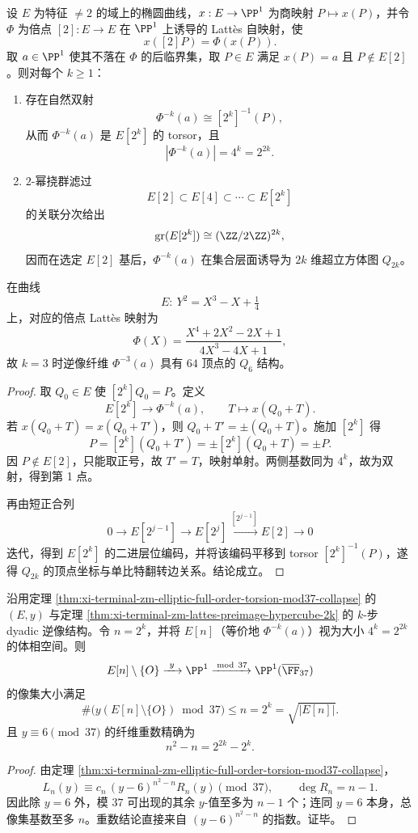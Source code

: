 \begin{theorem}\label{thm:xi-terminal-zm-lattes-preimage-hypercube-2k}
设 \(E\) 为特征 \(\neq 2\) 的域上的椭圆曲线，\(x:E\to\PP^{1}\) 为商映射 \(P\mapsto x(P)\)，并令 \(\Phi\) 为倍点 \([2]:E\to E\) 在 \(\PP^{1}\) 上诱导的 Latt\`es 自映射，使
\[
x([2]P)=\Phi(x(P)).
\]
取 \(a\in\PP^{1}\) 使其不落在 \(\Phi\) 的后临界集，取 \(P\in E\) 满足 \(x(P)=a\) 且 \(P\notin E[2]\)。则对每个 \(k\ge 1\)：
\begin{enumerate}
  \item 存在自然双射
  \[
  \Phi^{-k}(a)\cong [2^{k}]^{-1}(P),
  \]
  从而 \(\Phi^{-k}(a)\) 是 \(E[2^k]\) 的 torsor，且
  \[
  |\Phi^{-k}(a)|=4^k=2^{2k}.
  \]
  \item \(2\)-幂挠群滤过
  \[
  E[2]\subset E[4]\subset\cdots\subset E[2^k]
  \]
  的关联分次给出
  \[
  \mathrm{gr}(E[2^k])\cong(\ZZ/2\ZZ)^{2k},
  \]
  因而在选定 \(E[2]\) 基后，\(\Phi^{-k}(a)\) 在集合层面诱导为 \(2k\) 维超立方体图 \(Q_{2k}\)。
\end{enumerate}
在曲线
\[
E:\ Y^{2}=X^{3}-X+\tfrac14
\]
上，对应的倍点 Latt\`es 映射为
\[
\Phi(X)=\frac{X^{4}+2X^{2}-2X+1}{4X^{3}-4X+1},
\]
故 \(k=3\) 时逆像纤维 \(\Phi^{-3}(a)\) 具有 \(64\) 顶点的 \(Q_{6}\) 结构。
\end{theorem}
\begin{proof}
取 \(Q_0\in E\) 使 \([2^k]Q_0=P\)。定义
\[
E[2^k]\longrightarrow \Phi^{-k}(a),
\qquad
T\longmapsto x(Q_0+T).
\]
若 \(x(Q_0+T)=x(Q_0+T')\)，则 \(Q_0+T'=\pm(Q_0+T)\)。施加 \([2^k]\) 得
\[
P=[2^k](Q_0+T')=\pm[2^k](Q_0+T)=\pm P.
\]
因 \(P\notin E[2]\)，只能取正号，故 \(T'=T\)，映射单射。两侧基数同为 \(4^k\)，故为双射，得到第 1 点。

再由短正合列
\[
0\to E[2^{j-1}]\to E[2^j]\xrightarrow{[2^{j-1}]}E[2]\to 0
\]
迭代，得到 \(E[2^k]\) 的二进层位编码，并将该编码平移到 torsor \([2^k]^{-1}(P)\)，遂得 \(Q_{2k}\) 的顶点坐标与单比特翻转边关系。结论成立。
\end{proof}

\begin{corollary}\label{cor:xi-terminal-zm-badprime37-square-root-holographic-compression}
沿用定理 \ref{thm:xi-terminal-zm-elliptic-full-order-torsion-mod37-collapse} 的 \((E,y)\) 与定理 \ref{thm:xi-terminal-zm-lattes-preimage-hypercube-2k} 的 \(k\)-步 dyadic 逆像结构。令 \(n=2^k\)，并将 \(E[n]\)（等价地 \(\Phi^{-k}(a)\)）视为大小 \(4^k=2^{2k}\) 的体相空间。则
\[
E[n]\setminus\{O\}\xrightarrow{\ y\ }\PP^1\xrightarrow{\bmod\,37}\PP^1(\overline{\FF}_{37})
\]
的像集大小满足
\[
\#\bigl(y(E[n]\setminus\{O\})\bmod 37\bigr)\le n=2^k=\sqrt{|E[n]|}.
\]
且 \(y\equiv 6\pmod{37}\) 的纤维重数精确为
\[
n^2-n=2^{2k}-2^k.
\]
\end{corollary}
\begin{proof}
由定理 \ref{thm:xi-terminal-zm-elliptic-full-order-torsion-mod37-collapse}，
\[
L_n(y)\equiv c_n\,(y-6)^{n^2-n}R_n(y)\pmod{37},
\qquad
\deg R_n=n-1.
\]
因此除 \(y=6\) 外，模 \(37\) 可出现的其余 \(y\)-值至多为 \(n-1\) 个；连同 \(y=6\) 本身，总像集基数至多 \(n\)。重数结论直接来自 \((y-6)^{n^2-n}\) 的指数。证毕。
\end{proof}

